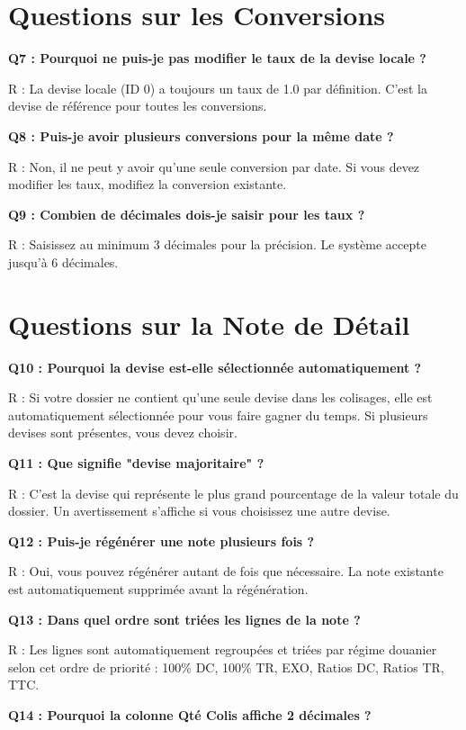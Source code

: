 \documentclass[12pt,a4paper]{report}
\begin{document}
\section{Questions sur les Conversions}

\textbf{Q7 : Pourquoi ne puis-je pas modifier le taux de la devise locale ?}

R : La devise locale (ID 0) a toujours un taux de 1.0 par définition. C'est la devise de référence pour toutes les conversions.

\textbf{Q8 : Puis-je avoir plusieurs conversions pour la même date ?}

R : Non, il ne peut y avoir qu'une seule conversion par date. Si vous devez modifier les taux, modifiez la conversion existante.

\textbf{Q9 : Combien de décimales dois-je saisir pour les taux ?}

R : Saisissez au minimum 3 décimales pour la précision. Le système accepte jusqu'à 6 décimales.

\section{Questions sur la Note de Détail}

\textbf{Q10 : Pourquoi la devise est-elle sélectionnée automatiquement ?}

R : Si votre dossier ne contient qu'une seule devise dans les colisages, elle est automatiquement sélectionnée pour vous faire gagner du temps. Si plusieurs devises sont présentes, vous devez choisir.

\textbf{Q11 : Que signifie "devise majoritaire" ?}

R : C'est la devise qui représente le plus grand pourcentage de la valeur totale du dossier. Un avertissement s'affiche si vous choisissez une autre devise.

\textbf{Q12 : Puis-je régénérer une note plusieurs fois ?}

R : Oui, vous pouvez régénérer autant de fois que nécessaire. La note existante est automatiquement supprimée avant la régénération.

\textbf{Q13 : Dans quel ordre sont triées les lignes de la note ?}

R : Les lignes sont automatiquement regroupées et triées par régime douanier selon cet ordre de priorité : 100\% DC, 100\% TR, EXO, Ratios DC, Ratios TR, TTC.

\textbf{Q14 : Pourquoi la colonne Qté Colis affiche 2 décimales ?}
\end{document}
